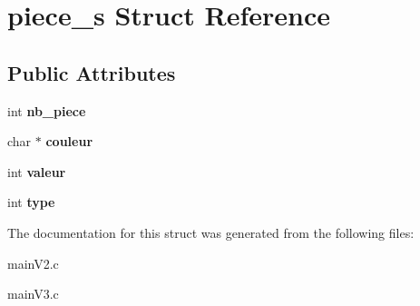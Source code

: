\hypertarget{structpiece__s}{}\section{piece\+\_\+s Struct Reference}
\label{structpiece__s}
\subsection*{Public Attributes}
\begin{DoxyCompactItemize}
\item 
\mbox{\label{structpiece__s_a93b9702c91ed253abd9949bf9bf4cfa0}} 
int {\bfseries nb\+\_\+piece}
\item 
\mbox{\label{structpiece__s_a7efda54920fdfa4a9144d94414b9cf37}} 
char $\ast$ {\bfseries couleur}
\item 
\mbox{\label{structpiece__s_a8cb9f1ede5963e4582fa147deb46dd6b}} 
int {\bfseries valeur}
\item 
\mbox{\label{structpiece__s_ad285674b8c721dd6e3d116e3ce71e352}} 
int {\bfseries type}
\end{DoxyCompactItemize}


The documentation for this struct was generated from the following files\+:\begin{DoxyCompactItemize}
\item 
main\+V2.\+c\item 
main\+V3.\+c\end{DoxyCompactItemize}
